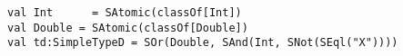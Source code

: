 \begin{lstlisting}[style=scalaioScala]
val Int      = SAtomic(classOf[Int])
val Double = SAtomic(classOf[Double])
val td:SimpleTypeD = SOr(Double, SAnd(Int, SNot(SEql("X"))))
\end{lstlisting}
